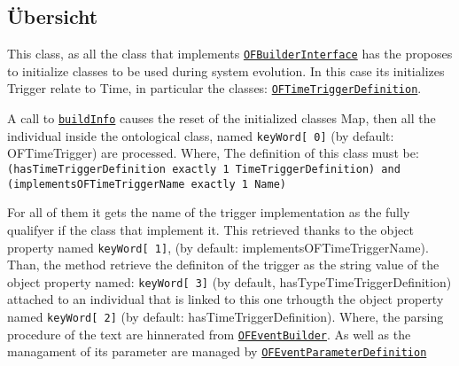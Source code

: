 \subsection{Übersicht}
This class, as all the class that implements \texttt{\hyperlink{ontologyFramework.OFRunning.OFInitialising.OFBuilderInterface<T>-class}{OFBuilderInterface}} has the proposes to initialize
 classes to be used during system evolution. In this case its initializes Trigger relate to Time,
 in particular the classes: \texttt{\hyperlink{ontologyFramework.OFEventManagement.OFTimeTriggerManagement.OFTimeTriggerDefinition-class}{OFTimeTriggerDefinition}}. 
 \par 
 A call to \texttt{\hyperlink{ontologyFramework.OFEventManagement.OFTimeTriggerManagement.OFTimeTriggerBuilder.buildInfo(java.lang.String[],ontologyFramework.OFContextManagement.OWLReferences,ontologyFramework.OFRunning.OFInvokingManager.OFBuildedListInvoker)}{buildInfo}} causes the reset of the
 initialized classes Map, then all the individual inside the ontological class, named \verb!keyWord[ 0]!
 (by default: \textquotedbl OFTimeTrigger\textquotedbl ) are processed. Where, The definition of this class must be:
 	\verb!(hasTimeTriggerDefinition exactly 1 TimeTriggerDefinition) and (implementsOFTimeTriggerName exactly 1 Name)!
 \par 
 For all of them it gets the name of the trigger implementation as the fully qualifyer if the class that
 implement it. This retrieved thanks to the object property named \verb!keyWord[ 1]!, (by default: \textquotedbl implementsOFTimeTriggerName\textquotedbl ).
 Than, the method retrieve the definiton of the trigger as the string value of the 
 object property named: \verb!keyWord[ 3]! (by default, \textquotedbl hasTypeTimeTriggerDefinition\textquotedbl )
 attached to an individual that is linked to this one trhougth the object property named
 \verb!keyWord[ 2]! (by default: \textquotedbl hasTimeTriggerDefinition\textquotedbl ). Where, the parsing procedure 
 of the text are hinnerated from \texttt{\hyperlink{ontologyFramework.OFEventManagement.OFLogicalEventManagement.OFEventBuilder-class}{OFEventBuilder}}. As well as the managament of its parameter
 are managed by \texttt{\hyperlink{ontologyFramework.OFEventManagement.OFEventParameterDefinition-class}{OFEventParameterDefinition}}
 \par 
